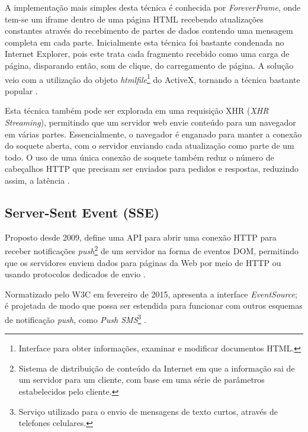 A implementação mais simples desta técnica é conhecida por \emph{ForeverFrame}, onde tem-se um iframe dentro de uma página HTML recebendo atualizações constantes através do recebimento de partes de dados contendo uma mensagem completa em cada parte. Inicialmente esta técnica foi bastante condenada no Internet Explorer, pois este trata cada fragmento recebido como uma carga de página, disparando então, som de clique, do carregamento de página. A solução veio com a utilização do objeto \emph{htmlfile}\footnote{Interface para obter informações, examinar e modificar documentos HTML.} do ActiveX, tornando a técnica bastante popular \cite{souders2009even}.

Esta técnica também pode ser explorada em uma requisição XHR (\emph{XHR Streaming}), permitindo que um servidor web envie conteúdo para um navegador em várias partes. Essencialmente, o navegador é enganado para manter a conexão do soquete aberta, com o servidor enviando cada atualização como parte de um todo. O uso de uma única conexão de soquete também reduz o número de cabeçalhos HTTP que precisam ser enviados para pedidos e respostas, reduzindo assim, a latência \cite{gutwin2011}.


\subsection{Server-Sent Event (SSE)}

Proposto desde 2009, define uma API para abrir uma conexão HTTP para receber notificações \emph{push}\footnote{Sistema de distribuição de conteúdo da Internet em que a informação sai de um servidor para um cliente, com base em uma série de parâmetros estabelecidos pelo cliente.} de um servidor na forma de eventos DOM, permitindo que os servidores enviem dados para páginas da Web por meio de HTTP ou usando protocolos dedicados de envio \cite{hicksonserver2015}.

Normatizado pelo W3C em fevereiro de 2015, apresenta a interface \emph{EventSource}; é projetada de modo que possa ser estendida para funcionar com outros esquemas de notificação \emph{push}, como \emph{Push SMS}\footnote{Serviço utilizado para o envio de mensagens de texto curtos, através de telefones celulares.} \cite{hicksonserver2015}.

